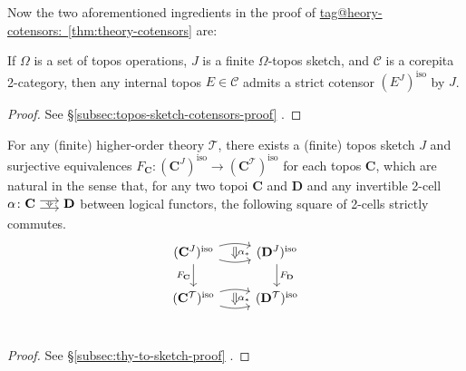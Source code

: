 \documentclass{amsart}
\makeatletter
\newcommand\bC{\mathbf{C}}
\newcommand\bD{\mathbf{D}}
\newcommand\cC{\mathcal{C}}
\newcommand\cT{\mathcal{T}}
\newcommand\iso{\mathrm{iso}}
\newcommand\tocell{\hspace{-5pt}\begin{tikzcd}[column sep=15pt, ampersand replacement=\&]{}\ar[r, shift left=3pt, ""{name=top}]\ar[r, shift right=3pt, ""'{name=bot}, start anchor=east, end anchor=west]\&{}\ar[Rightarrow, from=top, to=bot, shorten=0.5pt]\end{tikzcd}\hspace{-5pt}}
\newcommand\tagword[1]{\csname tag@#1\endcsname}
\def\label@tag#1:#2\@nil{#1}
\newcommand\labeltag[1]{\label@tag#1:\@nil}
\newcommand\jref[1]{%
  \texorpdfstring%
    {\hyperref[#1]{\tagword{\labeltag{#1}}~\ref*{#1}}}%
    {\tagword{\labeltag{#1}}~\ref*{#1}}%
}
\newcommand\prerefpost[3]{%
  \texorpdfstring%
    {\hyperref[#2]{#1\ref*{#2}#3}}%
    {#1\ref*{#2}#3}%
}
\newcommand\sref[1]{\prerefpost{\S}{#1}{}}
\theoremstyle{definition}
\theoremstyle{remark}
\theoremstyle{plainwithref}
\makeatother
\begin{document}
Now the two aforementioned ingredients in the proof of \jref{thm:theory-cotensors} are:
\begin{propn} \label{propn:topos-sketch-cotensors}
  If \( \Omega \) is a set of topos operations, \( J \) is a finite \( \Omega \)-topos sketch, and \( \cC \) is a corepita 2-category, then any internal topos \( E \in \cC \) admits a strict cotensor \( (E^J)^\iso \) by \( J \).
\end{propn}
\begin{proof}
  See \sref{subsec:topos-sketch-cotensors-proof}.
\end{proof}

\begin{propn} \label{propn:thy-to-sketch}
  For any (finite) higher-order theory \( \cT \), there exists a (finite) topos sketch \( J \) and surjective equivalences \( F_{\bC} \colon (\bC^J)^\iso \to (\bC^\cT)^\iso \) for each topos \( \bC \), which are natural in the sense that, for any two topoi \( \bC \) and \( \bD \) and any invertible 2-cell \( \alpha \colon \bC \tocell \bD \) between logical functors, the following square of 2-cells strictly commutes.
  \begin{equation} \label{eq:cotensor-comparison-square}
    \begin{tikzcd}
      (\bC^J)^\iso \ar[d, "F_\bC"']
      \ar[r, bend left=15pt, ""' {name=fs}]
      \ar[r, bend right=15pt, "" {name=gs}]
      \ar[from=fs, to=gs, shorten=-2pt, Rightarrow, "\alpha_*"]
      & (\bD^J)^\iso \ar[d, "F_{\bD}"] \\
      (\bC^{\cT})^\iso
      \ar[r, bend left=15pt, ""' {name=fs}]
      \ar[r, bend right=15pt, "" {name=gs}]
      \ar[from=fs, to=gs, shorten=-2pt, Rightarrow, "\alpha_*"]
      & (\bD^{\cT})^\iso \\
    \end{tikzcd}
  \end{equation}
\end{propn}
\begin{proof}
  See \sref{subsec:thy-to-sketch-proof}.
\end{proof}
\end{document}
